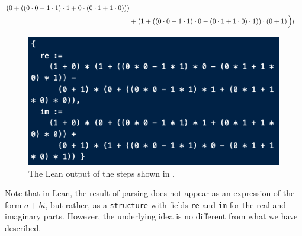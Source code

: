 \begin{boxexample}
\begin{enumerate}[noitemsep]
\begin{align*}
                    \left( 0 + \left( 
                        \left( 0 \cdot 0 - 1 \cdot 1 \right)
                            \cdot
                        1
                        +
                        0
                            \cdot
                        \left( 0 \cdot 1 + 1 \cdot 0 \right)
                     \right) \right) \\
                    & +
                    \left( 1 + \left( 
                        \left( 0 \cdot 0 - 1 \cdot 1 \right)
                            \cdot
                        0
                        -
                        \left( 0 \cdot 1 + 1 \cdot 0 \right)
                            \cdot
                        1
                     \right) \right)
                        \cdot
                    \left( 0 + 1 \right)
                  \Big)i
              \end{align*}
    \end{enumerate}
\end{boxexample}

\begin{figure}
    \centering
    \includegraphics[width=0.95\linewidth]{Chapters/5_Lean/Images/norm_numI_parse_output.png}
    \caption{The Lean output of the steps shown in .}
    \label{Ch5:Fig:Parse_Example}
\end{figure}

Note that in Lean, the result of parsing does not appear as an expression of the form $a + bi$, but rather, as a \lstinline|structure| with fields \lstinline|re| and \lstinline|im| for the real and imaginary parts. However, the underlying idea is no different from what we have described.

